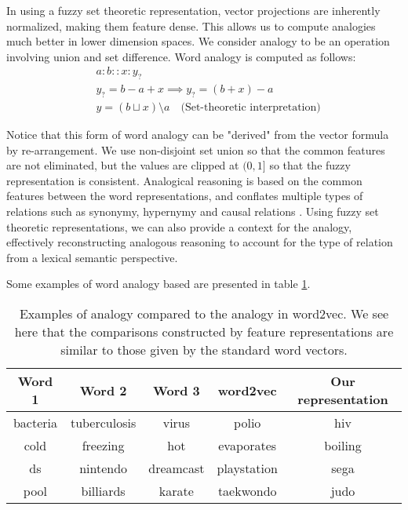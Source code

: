 \documentclass[11pt,a4paper]{article}
\begin{document}
In using a fuzzy set theoretic representation, vector projections are inherently normalized, making them feature dense. This allows us to compute analogies much better in lower dimension spaces. We consider analogy to be an operation involving union and set difference. Word analogy is computed as follows:
\begin{equation*}
\begin{split}
    &a : b :: x : y_? \\
    &y_? = b - a + x \implies y_? = (b + x) - a \\
    &y = (b \sqcup x) \setminus a \quad \text{(Set-theoretic interpretation)}
\end{split}
\end{equation*}

Notice that this form of word analogy can be "derived" from the vector formula by re-arrangement. We use non-disjoint set union so that the common features are not eliminated, but the values are clipped at $(0,1]$ so that the fuzzy representation is consistent. Analogical reasoning is based on the common features between the word representations, and conflates multiple types of relations such as synonymy, hypernymy and causal relations \citep{chen2017evaluating}. Using fuzzy set theoretic representations, we can also provide a context for the analogy, effectively reconstructing analogous reasoning to account for the type of relation from a lexical semantic perspective.

Some examples of word analogy based are presented in table \ref{tab: analogy}. 

\begin{table}[]
    \centering
    {\tiny
    \begin{tabular}{ccc|c|c}
        \bf Word 1  & \bf Word 2    & \bf Word 3    & \bf word2vec  & \bf Our representation    \\ \hline
        bacteria    & tuberculosis  & virus         & polio         & hiv                       \\
        cold        & freezing      & hot           & evaporates    & boiling                   \\
        ds          & nintendo      & dreamcast     & playstation   & sega                      \\
        pool        & billiards     & karate        & taekwondo     & judo                      \\
    \end{tabular}
    }
    \caption{Examples of analogy compared to the analogy in word2vec. We see here that the comparisons constructed by feature representations are similar to those given by the standard word vectors.}
    \label{tab: analogy}
\end{table}
\end{document}
